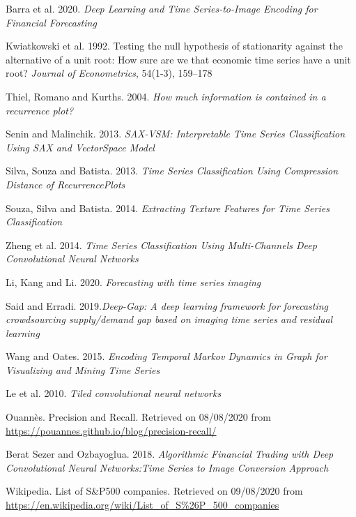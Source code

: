 \documentclass[11pt]{article}
\begin{document}
\begin{onehalfspace}
\begin{thebibliography}{9}
    Barra et al. 2020. \textit{Deep Learning and Time Series-to-Image Encoding for Financial Forecasting}

    Kwiatkowski et al. 1992. Testing the null hypothesis of stationarity against the alternative of a unit root: How sure are we that economic time series have a unit root? \textit{Journal of Econometrics}, 54(1-3), 159–178

    Thiel, Romano and Kurths. 2004. \textit{How much information is contained in a recurrence plot?}

    Senin and Malinchik. 2013. \textit{SAX-VSM: Interpretable Time Series Classification Using SAX and VectorSpace Model}

    Silva, Souza and Batista. 2013. \textit{ Time  Series  Classification  Using  Compression  Distance  of  RecurrencePlots}

    Souza, Silva and Batista. 2014. \textit{Extracting Texture Features for Time Series Classification}

    Zheng et al. 2014. \textit{Time Series Classification Using Multi-Channels Deep Convolutional Neural Networks}

    Li, Kang and Li. 2020. \textit{Forecasting with time series imaging}

    Said and Erradi. 2019.\textit{Deep-Gap: A deep learning framework for forecasting crowdsourcing supply/demand  gap  based  on  imaging  time  series  and  residual  learning}

    Wang and Oates. 2015. \textit{Encoding Temporal Markov Dynamics in Graph for Visualizing and Mining Time Series}

    Le et al. 2010. \textit{Tiled convolutional neural networks}

    Ouannès. Precision and Recall. Retrieved on 08/08/2020 from \url{https://pouannes.github.io/blog/precision-recall/}

    Berat Sezer and Ozbayoglua. 2018. \textit{Algorithmic Financial Trading with Deep Convolutional Neural Networks:Time Series to Image Conversion Approach}

    Wikipedia. List of S\&P500 companies. Retrieved on 09/08/2020 from \url{https://en.wikipedia.org/wiki/List_of_S%26P_500_companies}


\end{thebibliography}
\end{onehalfspace}
\end{document}

